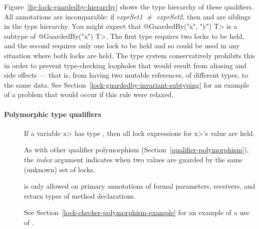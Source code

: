 Figure~\ref{fig-lock-guardedby-hierarchy} shows the type hierarchy of these
qualifiers.
All  annotations are incomparable:
if \emph{exprSet1} $\neq$ \emph{exprSet2}, then  and
 are siblings in the type hierarchy.
You might expect that
\<@GuardedBy({"x", "y"}) T> is a subtype of \<@GuardedBy({"x"}) T>.  The
first type requires two locks to be held, and the second requires only one
lock to be held and so could be used in any situation where both locks are
held.  The type system conservatively prohibits this in order to prevent
type-checking loopholes that would result from aliasing and side effects
--- that is, from having two mutable references, of different types, to the
same data. See
Section~\ref{lock-guardedby-invariant-subtyping} for an example
of a problem that would occur if this rule were relaxed.


\paragraph{Polymorphic type qualifiers\label{lock-polymorphic-type-qualifiers}}


\begin{description}

\item[]
  If a variable \<x> has type , then all
  lock expressions for \<x>'s value are held.

  As with other qualifier polymorphism
  (Section~\ref{qualifier-polymorphism}), the \emph{index} argument
  indicates when two values are guarded by the same (unknown) set of locks.

   is only allowed on primary annotations of
  formal parameters, receivers, and return types of method declarations.

  See Section~\ref{lock-checker-polymorphism-example}
  for an example of a use of .


\end{description}


